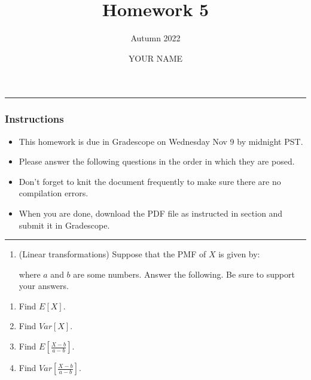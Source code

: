 \documentclass[
]{article}
\title{Homework 5}
\subtitle{Autumn 2022}
\author{YOUR NAME}
\date{}
\providecommand{\tightlist}{%
  \setlength{\itemsep}{0pt}\setlength{\parskip}{0pt}}
\begin{document}
\maketitle

\begin{center}\rule{0.5\linewidth}{0.5pt}\end{center}

\hypertarget{instructions}{%
\subsubsection{Instructions}\label{instructions}}

\begin{itemize}
\item
  This homework is due in Gradescope on Wednesday Nov 9 by midnight PST.
\item
  Please answer the following questions in the order in which they are
  posed.
\item
  Don't forget to knit the document frequently to make sure there are no
  compilation errors.
\item
  When you are done, download the PDF file as instructed in section and
  submit it in Gradescope.
\end{itemize}

\begin{center}\rule{0.5\linewidth}{0.5pt}\end{center}

\begin{enumerate}
\def\labelenumi{\arabic{enumi}.}
\tightlist
\item
  (Linear transformations) Suppose that the PMF of \(X\) is given by:

  \begin{table}[h]
  \centering
  \end{table}

  where \(a\) and \(b\) are some numbers. Answer the following. Be sure
  to support your answers.
\end{enumerate}

\begin{enumerate}
\def\labelenumi{\alph{enumi}.}
\item
  Find \(E \left[ X \right]\).
\item
  Find \(Var \left[ X \right]\).
\item
  Find \(E\left[ \frac{X - b}{a - b} \right]\).
\item
  Find \(Var \left[ \frac{X - b}{a - b} \right]\).
\end{enumerate}
\end{document}
